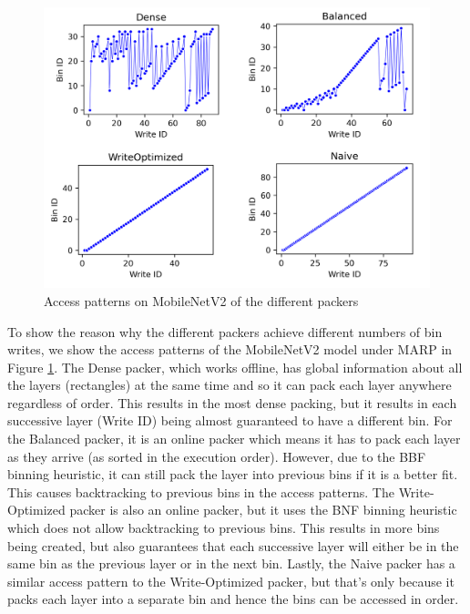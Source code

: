 \begin{figure}[htbp]
    \centering
    \includegraphics[width=\textwidth]{images/marp/mbv2_access_patterns.png}
    \caption{Access patterns on MobileNetV2 of the different packers}
    \label{fig:mbv2_access_patterns}
\end{figure}

To show the reason why the different packers achieve different numbers of bin writes, we show the access patterns of the MobileNetV2 model under MARP in Figure \ref{fig:mbv2_access_patterns}. The Dense packer, which works offline, has global information about all the layers (rectangles) at the same time and so it can pack each layer anywhere regardless of order. This results in the most dense packing, but it results in each successive layer (Write ID) being almost guaranteed to have a different bin. For the Balanced packer, it is an online packer which means it has to pack each layer as they arrive (as sorted in the execution order). However, due to the BBF binning heuristic, it can still pack the layer into previous bins if it is a better fit. This causes backtracking to previous bins in the access patterns. The Write-Optimized packer is also an online packer, but it uses the BNF binning heuristic which does not allow backtracking to previous bins. This results in more bins being created, but also guarantees that each successive layer will either be in the same bin as the previous layer or in the next bin. Lastly, the Naive packer has a similar access pattern to the Write-Optimized packer, but that's only because it packs each layer into a separate bin and hence the bins can be accessed in order. 

